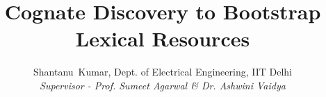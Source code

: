 \documentclass[journal]{IEEEtran}
\begin{document}
%
\title{Cognate Discovery to Bootstrap Lexical Resources}
%
%
%

\author{Shantanu~Kumar, Dept. of Electrical Engineering, IIT Delhi\\ \textit{Supervisor - Prof. Sumeet Agarwal \& Dr. Ashwini Vaidya}}

% 
%



%
{}
% 




\end{document}
